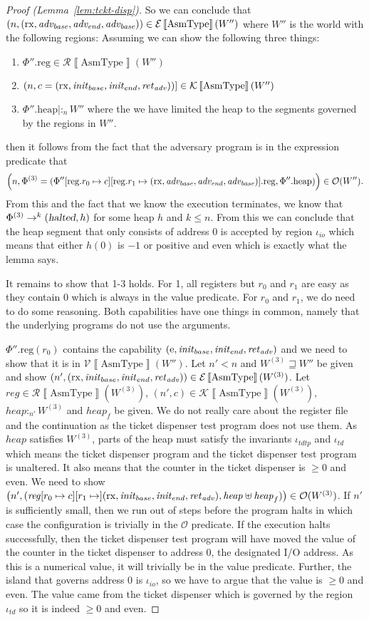 \documentclass{article}
\newcommand{\update}[2]{[#1 \mapsto #2]}
\newcommand{\sem}[1]{\left\llbracket #1 \right\rrbracket}
\newcommand{\var}[1]{\mathit{#1}}
\newcommand{\reg}{\var{reg}}
\newcommand{\heap}{\var{heap}}
\newcommand{\plainproj}[1]{\mathrm{#1}}
\newcommand{\memheap}[1][\Phi]{#1.\plainproj{heap}}
\newcommand{\memreg}[1][\Phi]{#1.\plainproj{reg}}
\newcommand{\updateReg}[3][\Phi]{#1\update{\plainproj{reg}.#2}{#3}}
\newcommand{\halted}{\textsl{halted}}
\newcommand{\future}{\mathbin{\sqsupseteq}}
\newcommand{\heapSat}[3][\heap]{#1 :_{#2} #3}
\newcommand{\asmType}{\plaindom{AsmType}}
\newcommand{\plaindom}[1]{\mathrm{#1}}
\newcommand{\intr}[2]{\mathcal{#1}\sem{#2}}
\newcommand{\valueintr}[1]{\intr{V}{#1}}
\newcommand{\exprintr}[1]{\intr{E}{#1}}
\newcommand{\contintr}[1]{\intr{K}{#1}}
\newcommand{\regintr}[1]{\intr{R}{#1}}
\newcommand{\stdvr}{\valueintr{\asmType}}
\newcommand{\stder}{\exprintr{\asmType}}
\newcommand{\stdrr}{\regintr{\asmType}}
\newcommand{\stdkr}{\contintr{\asmType}}
\newcommand{\observations}{\mathcal{O}}
\newcommand{\npair}[2][n]{\left(#1,#2 \right)}
\newcommand{\plainperm}[1]{\mathrm{#1}}
\newcommand{\exec}{\plainperm{rx}}
\newcommand{\entry}{\plainperm{e}}
\newcommand{\step}[1][]{\rightarrow_{#1}}
\begin{document}
\begin{proof}[Proof (Lemma~\ref{lem:tckt-disp})]
So we can conclude that $\npair{(\exec,\advb,\adve,\advb}) \in \stder(W'')$ where $W''$ is the world with the following regions:
Assuming we can show the following three things:
\begin{enumerate}
\item $\memreg[\Phi''] \in \stdrr(W'')$
\item $\npair{c = (\exec,\initb,\inite,\reta)}] \in \stdkr(W'')$
\item $\heapSat[{\memheap[\Phi'']}|]{n}{W''}$ where the we have limited the heap to the segments governed by the regions in $W''$.
\end{enumerate}
then it follows from the fact that the adversary program is in the expression predicate that
\[
\npair{\Phi^{(3)} = (\updateReg[\Phi'']{r_0}{c}[\plainproj{reg}.r_1 \mapsto (\exec,\advb,\adve,\advb)].\plainproj{reg},\memheap[\Phi''])} \in \observations(W'').
\]
From this and the fact that we know the execution terminates, we know that $\Phi^{(3)} \step^k (\halted,h)$ for some heap $h$ and $k \leq n$. From this we can conclude that the heap segment that only consists of address 0 is accepted by region $\iota_{\var{io}}$ which means that either $h(0)$ is $-1$ or positive and even which is exactly what the lemma says.

It remains to show that 1-3 holds. For 1, all registers but $r_0$ and $r_1$ are easy as they contain $0$ which is always in the value predicate. For $r_0$ and $r_1$, we do need to do some reasoning. Both capabilities have one things in common, namely that the underlying programs do not use the arguments.

$\memreg[\Phi''](r_0)$ contains the capability $(\entry,\initb,\inite,\reta)$ and we need to show that it is in $\stdvr(W'')$. Let $n' < n$ and $W^{(3)} \future W''$ be given and show $\npair[n']{(\exec,\initb,\inite,\reta)} \in \stder(W^{(3)})$. Let $\reg \in \stdrr(W^{(3)})$, $\npair[n']{c} \in \stdkr(W^{(3)})$, $\heapSat[\heap]{n'}{W^{(3)}}$ and $\heap_f$ be given. We do not really care about the register file and the continuation as the ticket dispenser test program does not use them. As $\heap$ satisfies $W^{(3)}$, parts of the heap must satisfy the invariants $\iota_{\var{tdtp}}$ and $\iota_{\var{td}}$ which means the ticket dispenser program and the ticket dispenser test program is unaltered. It also means that the counter in the ticket dispenser is $\geq 0$ and even. We need to show $\npair[n']{(\reg[r_0 \mapsto c][r_1 \mapsto ](\exec,\initb,\inite,\reta), \heap \uplus \heap_f)} \in \observations(W^{(3)})$. If $n'$ is sufficiently small, then we run out of steps before the program halts in which case the configuration is trivially in the $\observations$ predicate. If the execution halts successfully, then the ticket dispenser test program will have moved the value of the counter in the ticket dispenser to address 0, the designated I/O address. As this is a numerical value, it will trivially be in the value predicate. Further, the island that governs address 0 is $\iota_{\var{io}}$, so we have to argue that the value is $\geq 0$ and even. The value came from the ticket dispenser which is governed by the region $\iota_{\var{td}}$ so it is indeed $\geq 0$ and even.


\end{proof}
\end{document}
